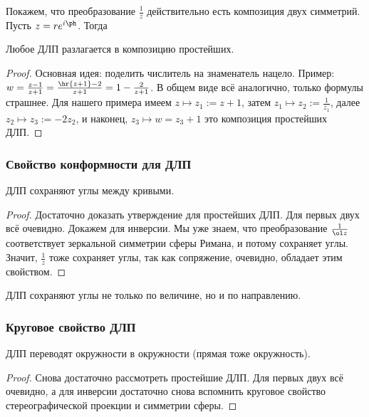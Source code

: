 \documentclass[a4paper]{article}
\begin{document}
Покажем, что преобразование $\frac{1}{z}$ действительно есть композиция двух симметрий. Пусть $z = re^{i\ph}$. Тогда

\begin{theorem}
Любое ДЛП разлагается в композицию простейших.
\end{theorem}
\begin{proof}
Основная идея: поделить числитель на знаменатель нацело.
Пример: $w = \frac{z - 1}{z + 1} = \frac{\hr{z + 1} - 2}{z + 1} = 1 - \frac{2}{z + 1}$.
В общем виде всё аналогично, только формулы страшнее. Для нашего примера имеем
$z \mapsto z_1 := z + 1$, затем $z_1 \mapsto z_2 := \frac{1}{z_1}$, далее
$z_2 \mapsto z_3 := - 2z_2$, и наконец, $z_3 \mapsto w = z_3 + 1$ это
композиция простейших ДЛП.
\end{proof}

\subsubsection{Свойство конформности для ДЛП}

\begin{theorem}
ДЛП сохраняют углы между кривыми.
\end{theorem}
\begin{proof}
Достаточно доказать утверждение для простейших ДЛП. Для первых двух всё очевидно. Докажем для
инверсии. Мы уже знаем, что преобразование $\frac{1}{\ol z}$ соответствует зеркальной симметрии сферы  Римана, и потому сохраняет углы.
Значит, $\frac{1}{z}$ тоже сохраняет углы, так как сопряжение, очевидно, обладает этим свойством.
\end{proof}

\begin{note}
ДЛП сохраняют углы не только по величине, но и по направлению.
\end{note}

\subsubsection{Круговое свойство ДЛП}

\begin{theorem}
ДЛП переводят окружности в окружности (прямая тоже окружность).
\end{theorem}
\begin{proof}
Снова достаточно рассмотреть простейшие ДЛП. Для первых двух всё очевидно, а для инверсии достаточно снова вспомнить
круговое свойство стереографической проекции и симметрии сферы.
\end{proof}
\end{document}
